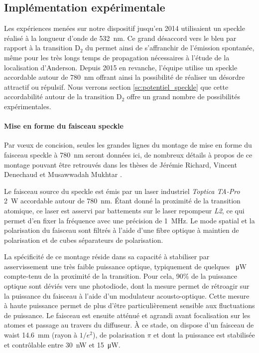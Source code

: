 \subsection{Implémentation expérimentale}
Les expériences menées sur notre dispositif jusqu'en 2014 utilisaient un speckle réalisé à la longueur d'onde de \SI{532}{\nano\metre}. Ce grand désaccord vers le bleu par rapport à la transition $\mathrm{D}_2$ du  permet ainsi de s'affranchir de l'émission spontanée, même pour les très longs temps de propagation nécessaires à l'étude de la localisation d'Anderson. Depuis 2015 en revanche, l'équipe utilise un speckle accordable autour de \SI{780}{\nano\metre} offrant ainsi la possibilité de réaliser un désordre attractif ou répulsif. Nous verrons section \ref{sc:potentiel_speckle} que cette accordabilité autour de la transition $\mathrm{D}_2$ offre un grand nombre de possibilités expérimentales.

\paragraph*{Mise en forme du faisceau speckle}
Par vœux de concision, seules les grandes lignes du montage de mise en forme du faisceau speckle à \SI{780}{\nano\metre} seront données ici, de nombreux détails à propos de ce montage pouvant être retrouvés dans les thèses de Jérémie Richard, Vincent Denechaud et Musawwadah Mukhtar \citep{richard2015propagation, denechaud2018vers, mukhtar2019state}.

Le faisceau source du speckle est émis par un laser industriel \emph{Toptica TA-Pro} \SI{2}{\watt} accordable autour de \SI{780}{\nano\metre}. Étant donné la proximité de la transition atomique, ce laser est asservi par battements sur le laser repompeur \emph{L2}, ce qui permet d'en fixer la fréquence avec une précision de \SI{1}{\mega\hertz}. Le mode spatial et la polarisation du faisceau sont filtrés à l'aide d'une fibre optique à maintien de polarisation et de cubes séparateurs de polarisation.

La spécificité de ce montage réside dans sa capacité à stabiliser par asservissement une très faible puissance optique, typiquement de quelques \SI{}{\micro\watt} compte-tenu de la proximité de la transition. Pour cela, 90\% de la puissance optique sont déviés vers une photodiode, dont la mesure permet de rétroagir sur la puissance du faisceau à l'aide d'un modulateur acousto-optique. Cette mesure à haute puissance permet de plus d'être particulièrement sensible aux fluctuations de puissance. Le faisceau est ensuite atténué et agrandi avant focalisation sur les atomes et passage au travers du diffuseur. À ce stade, on dispose d'un faisceau de waist \SI{14.6}{\milli\metre} (rayon à $1/e^2$), de polarisation $\pi$ et dont la puissance est stabilisée et contrôlable entre \SI{30}{\nano\watt} et \SI{15}{\micro\watt}.


